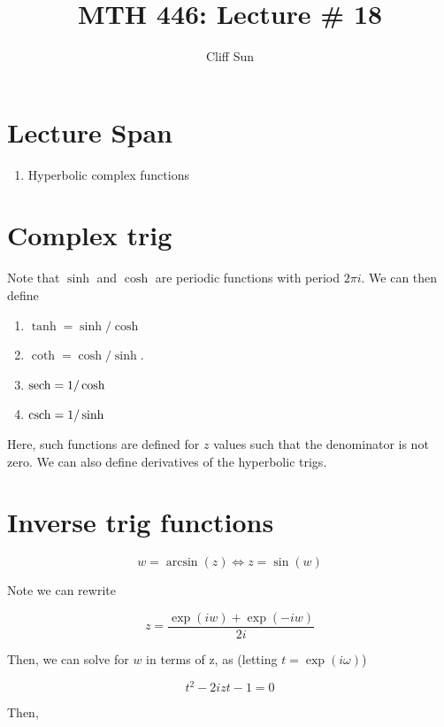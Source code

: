 \documentclass{article}
\title{MTH 446: Lecture \# 18}
\author{Cliff Sun}
\newtheorem{one minute paper}[theorem]{One Minute Paper}
\begin{document}
\maketitle

\section*{Lecture Span}
\begin{enumerate}
    \item Hyperbolic complex functions
\end{enumerate}

\section*{Complex trig}

Note that $\sinh$ and $\cosh$ are periodic functions with period $2\pi i$. We can then define 

\begin{enumerate}
    \item $\tanh = \sinh/\cosh$
    \item $\coth = \cosh/\sinh$. 
    \item $\sech = 1/\cosh$
    \item $\csch = 1/\sinh$
\end{enumerate}

Here, such functions are defined for $z$ values such that the denominator is not zero. We can also define derivatives of the hyperbolic trigs. 

\section*{Inverse trig functions}

\begin{equation}
    w = \arcsin(z) \iff z = \sin(w)
\end{equation}

Note we can rewrite 

\begin{equation}
    z = \frac{\exp(iw) + \exp(-iw)}{2i}
\end{equation}

Then, we can solve for $w$ in terms of z, as (letting $t = \exp(i\omega)$)

\begin{equation}
    t^2 - 2izt - 1 = 0
\end{equation}

Then, 
\end{document}
